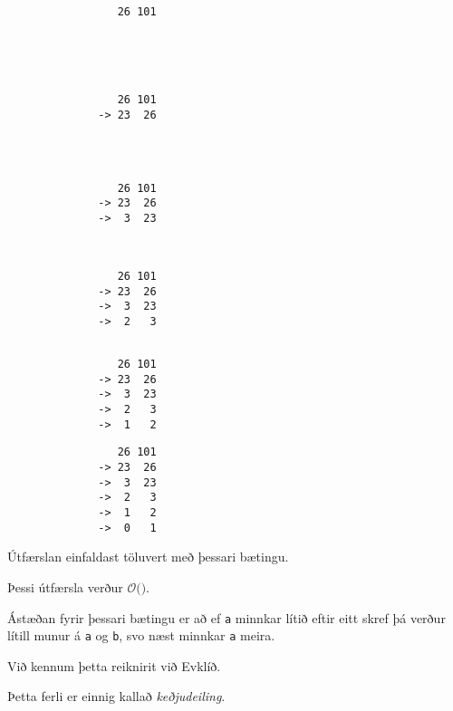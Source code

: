 { \begin{verbatim}
                 26 101





\end{verbatim}}
{ \begin{verbatim}
                 26 101
              -> 23  26




\end{verbatim}}
{ \begin{verbatim}
                 26 101
              -> 23  26
              ->  3  23



\end{verbatim}}
{ \begin{verbatim}
                 26 101
              -> 23  26
              ->  3  23
              ->  2   3


\end{verbatim}}
{ \begin{verbatim}
                 26 101
              -> 23  26
              ->  3  23
              ->  2   3
              ->  1   2

\end{verbatim}}
{ \begin{verbatim}
                 26 101
              -> 23  26
              ->  3  23
              ->  2   3
              ->  1   2
              ->  0   1
\end{verbatim}}

{
	\only<all:1>{\gcdA}
	\only<all:2>{\gcdB}
	\only<all:3>{\gcdC}
	\only<all:4>{\gcdD}
	\only<all:5>{\gcdE}
	\only<all:6>{\gcdF}
}

{
	{
		\item<1-> Útfærslan einfaldast töluvert með þessari bætingu.
		\item<2->[] 
		\item<3-> Þessi útfærsla verður $\mathcal{O}($\onslide<4->{$\log \max(a, b)$}$)$.
		\item<5-> Ástæðan fyrir þessari bætingu er að ef \texttt{a} minnkar lítið eftir eitt skref
					þá verður lítill munur á \texttt{a} og \texttt{b}, svo næst minnkar \texttt{a} meira.
		\item<6-> Við kennum þetta reiknirit við Evklíð.
		\item<7-> Þetta ferli er einnig kallað \emph{keðjudeiling}.
	}
}

